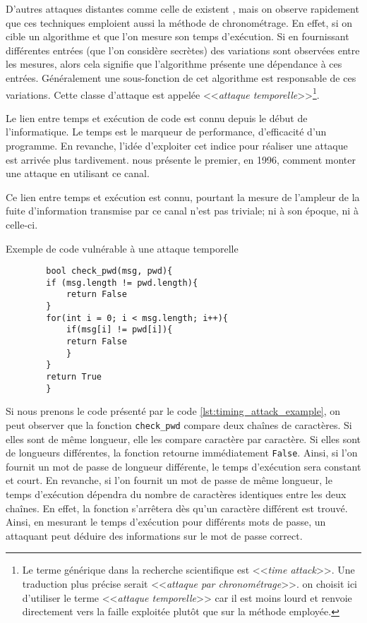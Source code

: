 D'autres attaques distantes comme celle de \citeauthor{LLC_attack} existent \cite{cryptoeprint:2016/224,Moghimi_2017,vanbulck2018nemesis}, mais on observe rapidement que ces techniques emploient aussi la méthode de chronométrage. En effet, si on cible un algorithme et que l'on mesure son temps d'exécution. Si en fournissant différentes entrées (que l'on considère secrètes) des variations sont observées entre les mesures, alors cela signifie que l'algorithme présente une dépendance à ces entrées. Généralement une sous-fonction de cet algorithme est responsable de ces variations. Cette classe d'attaque est appelée <<\textit{attaque temporelle}>>\footnote{Le terme générique dans la recherche scientifique est <<\textit{time attack}>>. Une traduction plus précise serait <<\textit{attaque par chronométrage}>>. on choisit ici d'utiliser le terme <<\textit{attaque temporelle}>> car il est moins lourd et renvoie directement vers la faille exploitée plutôt que sur la méthode employée.}.\medbreak

Le lien entre temps et exécution de code est connu depuis le début de l'informatique. Le temps est le marqueur de performance, d'efficacité d'un programme. En revanche, l'idée d'exploiter cet indice pour réaliser une attaque est arrivée plus tardivement. \citeauthor{crypto-1996-1469} nous présente le premier, en 1996, comment monter une attaque en utilisant ce canal.\medbreak

Ce lien entre temps et exécution est connu, pourtant la mesure de l'ampleur de la fuite d'information transmise par ce canal n'est pas triviale; ni à son époque, ni à celle-ci.

\begin{listing}[!ht]
    \caption{Exemple de code vulnérable à une attaque temporelle}
    \label{lst:timing_attack_example}
    \begin{verbatim}
        bool check_pwd(msg, pwd){
        if (msg.length != pwd.length){
            return False
        }
        for(int i = 0; i < msg.length; i++){
            if(msg[i] != pwd[i]){
            return False
            }
        }
        return True
        }
    \end{verbatim}
\end{listing}
                
Si nous prenons le code présenté par le code \ref{lst:timing_attack_example}, on peut observer que la fonction \texttt{check\_pwd} compare deux chaînes de caractères. Si elles sont de même longueur, elle les compare caractère par caractère. Si elles sont de longueurs différentes, la fonction retourne immédiatement \texttt{False}. Ainsi, si l'on fournit un mot de passe de longueur différente, le temps d'exécution sera constant et court. En revanche, si l'on fournit un mot de passe de même longueur, le temps d'exécution dépendra du nombre de caractères identiques entre les deux chaînes. En effet, la fonction s'arrêtera dès qu'un caractère différent est trouvé. Ainsi, en mesurant le temps d'exécution pour différents mots de passe, un attaquant peut déduire des informations sur le mot de passe correct.\medbreak

